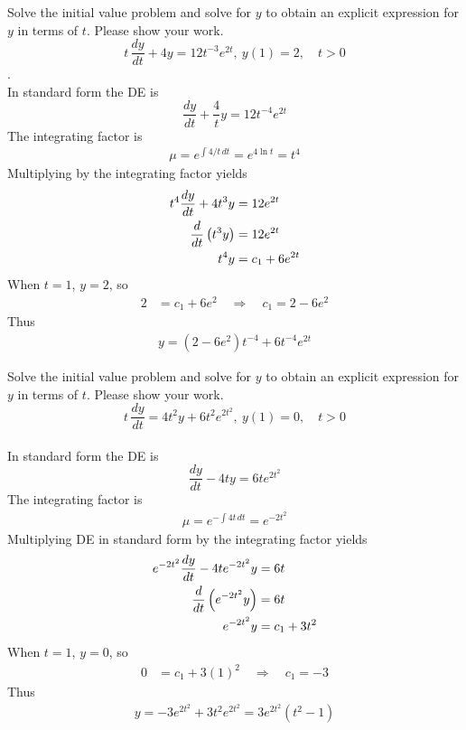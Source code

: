 \ifnum {}
\ifnum {} \newpage \fi
\question[5] Solve the initial value problem and solve for $y$ to obtain an explicit expression for $y$ in terms of $t$. Please show your work.
$$\displaystyle t\,\frac{dy}{dt} + 4y =  12 t^{-3}e^{2t}, \ y(1) = 2, \quad t > 0$$.
\ifnum {} {\color{DarkBlue} \\[12pt] 
In standard form the DE is
$$\displaystyle \frac{dy}{dt} + \frac4t y =  12 t^{-4}e^{2t}$$
The integrating factor is
\begin{align}
    \mu = e^{\int 4/t \, dt} = e^{4 \ln t} = t^4
\end{align}
Multiplying by the integrating factor yields
\begin{align}
    t^4 {\frac{dy}{dt}} + 4t^3 y &= 12e^{2t} \\
    {\frac{d}{dt}} \left( t^3 y \right) &= 12e^{2t} \\
     t^4 y  &= c_1 + 6e^{2t} 
\end{align}
When $t=1$, $y=2$, so
\begin{align}
    2 &= c_1 + 6e^2 \quad \Rightarrow \quad c_1 = 2 - 6e^2
\end{align}
Thus
\begin{align}
    y = (2-6e^2)t^{-4} + 6t^{-4}e^{2t}
\end{align}
} 
\else 
\vspace{3cm}
\fi
\fi   





\ifnum {}
\ifnum {} \newpage \fi
\question[5] Solve the initial value problem and solve for $y$ to obtain an explicit expression for $y$ in terms of $t$. Please show your work.
$$\displaystyle t\,\frac{dy}{dt} = 4t^2y +  6t^2e^{2t^2}, \ y(1) = 0, \quad t > 0$$
\ifnum {} {\color{DarkBlue} \\[12pt] 
In standard form the DE is
$$\displaystyle \frac{dy}{dt} - 4t y =  6 te^{2t^2}$$
The integrating factor is
\begin{align}
    \mu = e^{-\int 4t \, dt} = e^{-2t^2} 
\end{align}
Multiplying DE in standard form by the integrating factor yields
\begin{align}
    e^{-2t^2} {\frac{dy}{dt}} - 4te^{-2t^2} y &= 6t \\
    {\frac{d}{dt}} \left( e^{-2t^2} y \right) &= 6t \\
     e^{-2t^2} y  &= c_1 + 3t^2
\end{align}
When $t=1$, $y=0$, so
\begin{align}
    0 &= c_1 + 3(1)^2 \quad \Rightarrow \quad c_1 = -3
\end{align}
Thus
\begin{align}
    y = -3 e^{2t^2} +3t^2e^{2t^2} = 3e^{2t^2}\left( t^2 -1 \right)
\end{align}
} 
\else 
\vspace{3cm}
\fi
\fi   





